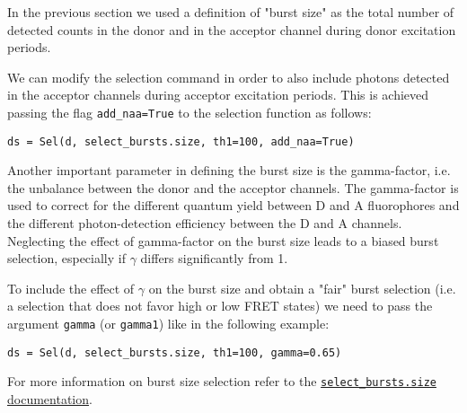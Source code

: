 In the previous section we used a definition of "burst size" as the total number
of detected counts in the donor and in the acceptor channel during donor
excitation periods. 

We can modify the selection command in order to also include photons detected in
the acceptor channels during acceptor excitation periods. This is achieved
passing the flag \verb|add_naa=True| to the selection function as
follows:

\begin{verbatim}
ds = Sel(d, select_bursts.size, th1=100, add_naa=True)
\end{verbatim}

Another important parameter in defining the burst size is the gamma-factor, i.e.
the unbalance between the donor and the acceptor channels. The gamma-factor is
used to correct for the different quantum yield between D and A fluorophores and
the different photon-detection efficiency between the D and A channels.
Neglecting the effect of gamma-factor on the burst size leads to a biased burst
selection, especially if $\gamma$ differs significantly from 1. 

To include the effect of $\gamma$ on the burst size and obtain a "fair" burst
selection (i.e. a selection that does not favor high or low FRET states) we
need to pass the argument \verb|gamma| (or \verb|gamma1|) like in the following
example:

\begin{verbatim}
ds = Sel(d, select_bursts.size, th1=100, gamma=0.65)
\end{verbatim}

For more information on burst size selection refer to the
\href{http://fretbursts.readthedocs.org/en/latest/burst_selection.html#fretbursts.select\_bursts.size}{\texttt{select\_bursts.size} documentation}.


